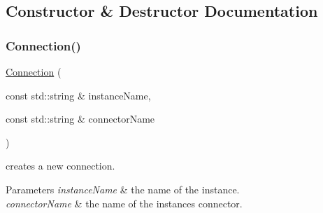 \subsection{Constructor \& Destructor Documentation}
\mbox{\label{class_open_chams_1_1_net_1_1_connection_a3e223d6a7eec0634d6b5cc90692b9cff}} 
\subsubsection{\texorpdfstring{Connection()}{Connection()}}
{\footnotesize\ttfamily \mbox{\hyperlink{class_open_chams_1_1_net_1_1_connection}{Connection}} (\begin{DoxyParamCaption}\item[{const std\+::string \&}]{instance\+Name,  }\item[{const std\+::string \&}]{connector\+Name }\end{DoxyParamCaption})}



creates a new connection. 


\begin{DoxyParams}{Parameters}
{\em instance\+Name} & the name of the instance. \\
\hline
{\em connector\+Name} & the name of the instance\textquotesingle{}s connector. \\
\hline
\end{DoxyParams}

